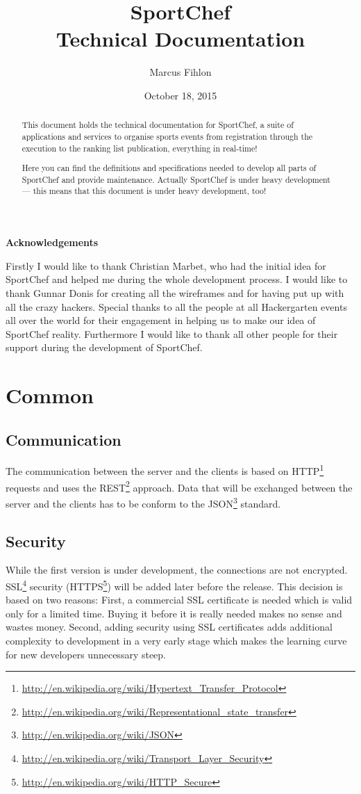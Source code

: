 \documentclass[a4paper,openright,twoside]{report}
\title{\huge SportChef \\[0.25cm] \LARGE Technical Documentation}
\author{Marcus Fihlon}
\date{October 18, 2015}
\makeatletter
\newcommand\ackname{Acknowledgements}
\newenvironment{acknowledgements}{%
      \titlepage
      \null\vfil
      \@beginparpenalty\@lowpenalty
      \begin{center}%
        \bfseries \ackname
        \@endparpenalty\@M
      \end{center}}%
     {\par\vfil\null\endtitlepage}
\newenvironment{acknowledgements}{%
      \if@twocolumn
        \section*{\abstractname}%
      \else
        \small
        \begin{center}%
          {\bfseries \ackname\vspace{-.5em}\vspace{\z@}}%
        \end{center}%
        \quotation
      \fi}
      {\if@twocolumn\else\endquotation\fi}
\makeatother
\begin{document}
\maketitle
\newpage

\begin{abstract}
This document holds the technical documentation for SportChef, a suite of applications and services to organise sports events from registration through the execution to the ranking list publication, everything in real-time!

Here you can find the definitions and specifications needed to develop all parts of SportChef and provide maintenance. Actually SportChef is under heavy development --- this means that this document is under heavy development, too!
\end{abstract}
\newpage

\begin{acknowledgements}
Firstly I would like to thank Christian Marbet, who had the initial idea for SportChef and helped me during the whole development process. I would like to thank Gunnar Donis for creating all the wireframes and for having put up with all the crazy hackers. Special thanks to all the people at all Hackergarten events all over the world for their engagement in helping us to make our idea of SportChef reality. Furthermore I would like to thank all other people for their support during the development of SportChef.
\end{acknowledgements}
\newpage

\tableofcontents
\newpage

\chapter{Common}

\section{Communication}\label{sec:Communication}
The communication between the server and the clients is based on HTTP\footnote{\url{http://en.wikipedia.org/wiki/Hypertext_Transfer_Protocol}} requests and uses the REST\footnote{\url{http://en.wikipedia.org/wiki/Representational_state_transfer}} approach. Data that will be exchanged between the server and the clients has to be conform to the JSON\footnote{\url{http://en.wikipedia.org/wiki/JSON}} standard.

\section{Security}
While the first version is under development, the connections are not encrypted. SSL\footnote{\url{http://en.wikipedia.org/wiki/Transport_Layer_Security}} security (HTTPS\footnote{\url{http://en.wikipedia.org/wiki/HTTP_Secure}}) will be added later before the release. This decision is based on two reasons: First, a commercial SSL certificate is needed which is valid only for a limited time. Buying it before it is really needed makes no sense and wastes money. Second, adding security using SSL certificates adds additional complexity to development in a very early stage which makes the learning curve for new developers unnecessary steep.
\end{document}

